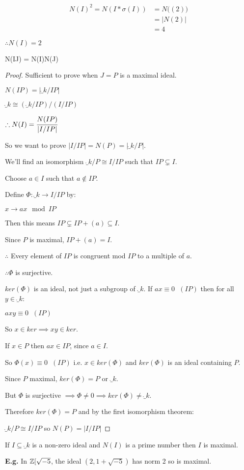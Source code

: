 \documentclass[11pt]{article}
\begin{document}
\begin{align*}
	N(I)^2 = N(I*\sigma(I)) &= N\Big((2)\Big)\\
	& = |N(2)|\\
	 & = 4
\end{align*}

$\therefore N(I) = 2$

\begin{theorem}
	N(IJ) = N(I)N(J) 
\end{theorem}
\begin{proof}
Sufficient to prove when $J=P$ is a maximal ideal.
\spa

	$N(IP) = |\ring_k / IP|$
\spa

	$\ring_k \cong (\ring_k/IP) \Big/ (I/IP)$
\spa

	$\therefore N(I) = \cfrac{N(IP)}{|I/IP|}$
\spac

	So we want to prove $|I/IP| = N(P) = |\ring_k / P|$.
\spa

	We'll find an isomorphism $\ring_k / P \cong I/IP$ such that $IP \subsetneq I$.
\spa

Choose $a \in I$ such that $a \not \in IP$.
\spa

Define $\Phi : \ring_k \rightarrow I/IP$ by:



	\hspace{59pt}$x \rightarrow ax \mod IP$
\spa

	Then this means $IP \subsetneq IP+(a) \subseteq I$.
\spa

	Since $P$ is maximal, $IP + (a) = I$.
	\spa

	$\therefore$ Every element of $IP$ is congruent mod $IP$ to a multiple of $a$.
\spa

$\therefore \Phi $ is surjective.
\spa

	$ker( \Phi)$ is an ideal, not just a subgroup of $\ring_k$.
	If $ax \equiv 0 \hspace{7pt} (IP) $ then for all $y \in \ring_k$:
\spa

	$axy \equiv 0 \hspace{7pt} (IP)$
\spa

So $x \in ker \implies xy \in ker$.
\spa
	
	If $x \in P$ then $ax \in IP$, since $a \in I$.
\spa

	So $\Phi(x) \equiv 0 \hspace{7pt} (IP) $ i.e. $x \in ker(\Phi)$ and $ker(\Phi)$ is an ideal containing $P$.
	\spa

	Since $P$ maximal, $ker(\Phi) = P$ or $\ring_k$.
\spa

	But $\Phi$ is surjective $\implies \Phi \neq 0 \implies ker(\Phi) \neq \ring_k$.
\spa

Therefore $ker(\Phi) = P$ and by the first isomorphism theorem:
\spa

$\ring_k / P \cong I/IP$ so $ N(P) = |I/IP|$

\end{proof}
\begin{cor}
	If $I \subseteq \ring_k$ is a non-zero ideal and $N(I)$ is a prime number then $I$ is maximal.
\end{cor}
\spa
\textbf{E.g.} In $\mathbb{Z}[\sqrt{-5}$, the ideal $(2, 1+\sqrt{-5})$ has norm 2 so is maximal.
\end{document}
